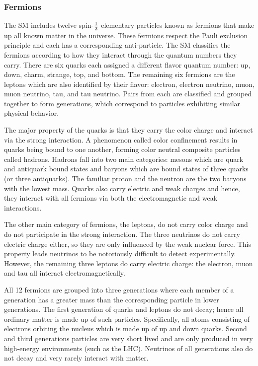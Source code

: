 \subsubsection{Fermions}
\label{sec:intro_sm_fermions}
The SM includes twelve spin-$\rm{\frac{1}{2}}$ elementary particles known as
fermions that make up all known matter in the universe. These fermions respect
the Pauli exclusion principle and each has a corresponding anti-particle. The
SM classifies the fermions according to how they interact through the quantum
numbers they carry. There are six quarks each assigned a different flavor
quantum number: up, down, charm, strange, top, and bottom. The remaining six
fermions are the leptons which are also identified by their flavor: electron,
electron neutrino, muon, muon neutrino, tau, and tau neutrino. Pairs from each
are classified and grouped together to form generations, which correspond to
particles exhibiting similar physical behavior.

The major property of the quarks is that they carry the color charge and
interact via the strong interaction. A phenomenon called color confinement
results in quarks being bound to one another, forming color neutral composite
particles called hadrons. Hadrons fall into two main categories: mesons which
are quark and antiquark bound states and baryons which are bound states of
three quarks (or three antiquarks). The familiar proton and the neutron are the
two baryons with the lowest mass. Quarks also carry electric and weak charges
and hence, they interact with all fermions via both the electromagnetic and
weak interactions.

The other main category of fermions, the leptons, do not carry color charge
and do not participate in the strong interaction. The three neutrinos do not
carry electric charge either, so they are only influenced by the weak nuclear
force. This property leads neutrinos to be notoriously difficult to detect
experimentally. However, the remaining three leptons do carry electric charge:
the electron, muon and tau all interact electromagnetically.

All 12 fermions are grouped into three generations where each member of
a generation has a greater mass than the corresponding particle in lower
generations. The first generation of quarks and leptons do not decay; hence
all ordinary matter is made up of such particles. Specifically, all atoms
consisting of electrons orbiting the nucleus which is made up of up and down
quarks. Second and third generations particles are very short lived and are
only produced in very high-energy environments (such as the LHC). Neutrinos
of all generations also do not decay and very rarely interact with matter.

